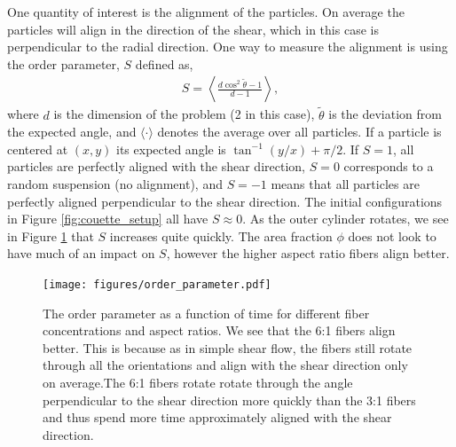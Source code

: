 \documentclass[preprint, 10pt]{elsarticle}
\begin{document}
One quantity of interest is the alignment of the particles. On average the particles will align in the direction of the shear, which in this case is perpendicular to the radial direction. One way
to measure the alignment is using the order parameter, $S$ defined as,
\begin{align*}
  S = \left\langle \frac{d \cos^2\tilde{\theta} - 1}{d - 1} \right\rangle,
\end{align*}
where $d$ is the dimension of the problem (2 in this case),
$\tilde{\theta}$ is the deviation from the expected angle, and $\langle
\cdot\rangle$ denotes the average over all particles. If a particle is
centered at $(x,y)$ its expected angle is $\tan^{-1}(y/x) + \pi/2$. If $S=1$, all particles are perfectly aligned with the shear direction, $S=0$ corresponds to a random suspension (no alignment), and $S=-1$ means that all particles are perfectly aligned perpendicular to the shear direction. The initial configurations in Figure \ref{fig:couette_setup} all have $S\approx 0$. As the outer cylinder rotates, we see in Figure \ref{fig:angles} that $S$ increases quite quickly. The area fraction $\phi$ does not look to have much of an impact on $S$, however the higher aspect ratio fibers align better.
\begin{figure}[!h]
\begin{center}
\texttt{[image: figures/order\_parameter.pdf]}\\
\end{center}
\caption{The order parameter as a function of time for different fiber concentrations and aspect
ratios. We see that the 6:1 fibers align better. This is because as in simple shear flow, the fibers
still rotate through all the orientations and align with the shear direction only on average.The 6:1
fibers rotate rotate through the angle perpendicular to the shear direction more quickly than the
3:1 fibers and thus spend more time approximately aligned with the shear direction.
}\label{fig:angles}
\end{figure} 
\end{document}
